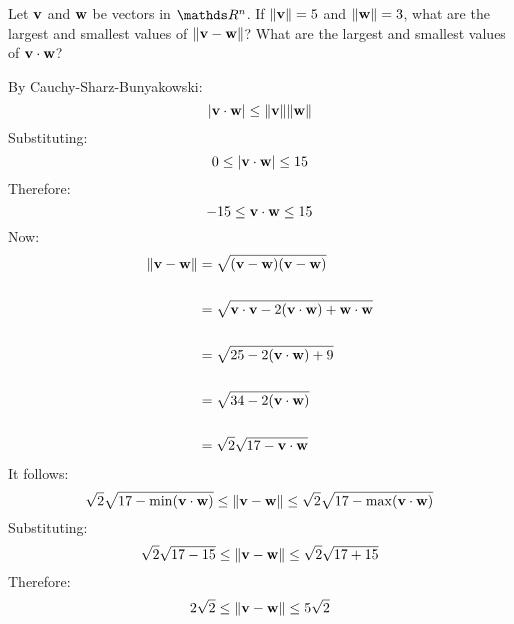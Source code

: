 \begin{problem}{\problemnum} 
Let $\mathbf{v}$ and $\mathbf{w}$ be vectors in $\bbR^{n}$. If $\lVert\mathbf{v}\rVert=5$ and $\lVert\mathbf{w}\rVert=3$, what are the largest and smallest values of $\lVert\mathbf{v}-\mathbf{w}\rVert$? What are the largest and smallest values of $\mathbf{v} \cdot \mathbf{w}$?
\end{problem}
\begin{solution}
    By Cauchy-Sharz-Bunyakowski:
    \[\lvert \mathbf{v} \cdot \mathbf{w} \rvert \le \lVert\mathbf{v}\rVert\lVert\mathbf{w}\rVert\]
    Substituting:
    \[ 0 \le \lvert \mathbf{v} \cdot \mathbf{w} \rvert \le 15 \]
    Therefore:
    \[ -15 \le \mathbf{v} \cdot \mathbf{w} \le 15 \]
    Now:
    \begin{align*}
        \lVert\mathbf{v} - \mathbf{w}\rVert &= \sqrt{(\mathbf{v} - \mathbf{w})(\mathbf{v} - \mathbf{w})}
        \\\\
        &= \sqrt{\mathbf{v} \cdot \mathbf{v} - 2(\mathbf{v} \cdot \mathbf{w}) + \mathbf{w} \cdot \mathbf{w}}
        \\\\
        &= \sqrt{25 - 2(\mathbf{v} \cdot \mathbf{w}) + 9}
        \\\\
        &= \sqrt{34 - 2(\mathbf{v} \cdot \mathbf{w})}
        \\\\
        &= \sqrt{2}\sqrt{17 - \mathbf{v} \cdot \mathbf{w}}
    \end{align*}
    It follows:
    \[  \sqrt{2}\sqrt{17 - \min(\mathbf{v} \cdot \mathbf{w})}
    \le \lVert\mathbf{v} - \mathbf{w}\rVert
    \le \sqrt{2}\sqrt{17 - \max(\mathbf{v} \cdot \mathbf{w})}
    \]
    Substituting:
    \[  \sqrt{2}\sqrt{17 - 15}
    \le \lVert\mathbf{v} - \mathbf{w}\rVert
    \le \sqrt{2}\sqrt{17 + 15}
    \]
    Therefore:
    \[  2\sqrt{2}
    \le \lVert\mathbf{v} - \mathbf{w}\rVert
    \le 5\sqrt{2}
    \]
\end{solution}
